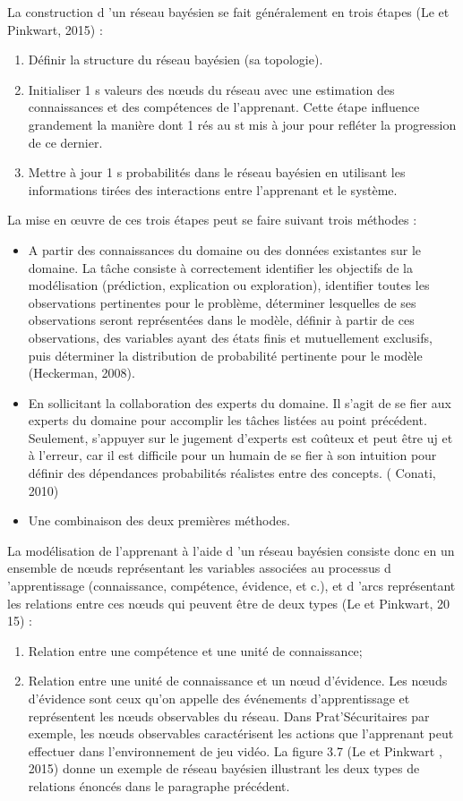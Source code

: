 La construction d 'un réseau bayésien se fait généralement en trois étapes (Le et Pinkwart, 2015) : 
\begin{enumerate}
\item  Définir la structure du réseau bayésien (sa topologie). 
\item  Initialiser 1 s valeurs des nœuds du réseau avec une estimation des connaissances et des compétences de l'apprenant. Cette étape influence grandement la manière dont 1 rés au st mis à jour pour refléter la progression de ce dernier.
\item Mettre à jour 1 s probabilités dans le réseau bayésien en utilisant les informations tirées des interactions entre l'apprenant et le système.
\end{enumerate}

La mise en œuvre de ces trois étapes peut se faire suivant trois méthodes : 
\begin{itemize}
\item A partir des connaissances du domaine ou des données existantes sur le domaine. La tâche consiste à correctement identifier les objectifs de la modélisation (prédiction, explication ou exploration), identifier toutes les observations pertinentes pour le problème, déterminer lesquelles de ses observations seront représentées dans le modèle, définir à partir de ces observations, des variables ayant des états finis et mutuellement exclusifs, puis déterminer la distribution de probabilité pertinente pour le modèle (Heckerman, 2008).
\item  En sollicitant la collaboration des experts du domaine. Il s'agit de se fier aux experts du domaine pour accomplir les tâches listées au point précédent. Seulement, s'appuyer sur le jugement d'experts est coûteux et peut être uj et à l'erreur, car il est difficile pour un humain de se fier à son intuition pour définir des dépendances probabilités réalistes entre des concepts. ( Conati, 2010) 
\item Une combinaison des deux premières méthodes.
\end{itemize}

 La modélisation de l'apprenant à l'aide d 'un réseau bayésien consiste donc en un ensemble de nœuds représentant les variables associées au processus d 'apprentissage (connaissance, compétence, évidence, et c.), et d 'arcs représentant les relations entre ces nœuds qui peuvent être de deux types (Le et Pinkwart, 20 15) : 
 
\begin{enumerate}
\item Relation entre une compétence et une unité de connaissance;
\item Relation entre une unité de connaissance et un nœud d'évidence. Les nœuds d'évidence sont ceux qu'on appelle des événements d'apprentissage et représentent les nœuds observables du réseau. Dans Prat'Sécuritaires par exemple, les nœuds observables caractérisent les actions que l'apprenant peut effectuer dans l'environnement de jeu vidéo. La figure 3.7 (Le et Pinkwart , 2015)  donne un exemple de réseau bayésien illustrant les deux types de relations énoncés dans le paragraphe précédent.\\\
\end{enumerate}

